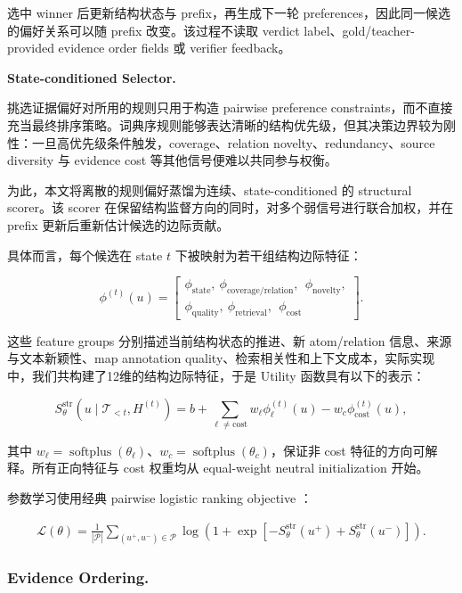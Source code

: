 \documentclass[letterpaper]{article}
\begin{document}
选中 winner 后更新结构状态与 prefix，再生成下一轮 preferences，因此同一候选的偏好关系可以随 prefix 改变。该过程不读取 verdict label、gold/teacher-provided evidence order fields 或 verifier feedback。

\textbf{State-conditioned Selector.}

挑选证据偏好对所用的规则只用于构造 pairwise preference constraints，而不直接充当最终排序策略。词典序规则能够表达清晰的结构优先级，但其决策边界较为刚性：一旦高优先级条件触发，coverage、relation novelty、redundancy、source diversity 与 evidence cost 等其他信号便难以共同参与权衡。

为此，本文将离散的规则偏好蒸馏为连续、state-conditioned 的 structural scorer。该 scorer 在保留结构监督方向的同时，对多个弱信号进行联合加权，并在 prefix 更新后重新估计候选的边际贡献。

具体而言，每个候选在 state $t$ 下被映射为若干组结构边际特征：

\[
\phi^{(t)}(u)=\left[
\begin{gathered}
\phi_{\mathrm{state}},\ \phi_{\mathrm{coverage/relation}},\
\ \phi_{\mathrm{novelty}},\\
\phi_{\mathrm{quality}},\ \phi_{\mathrm{retrieval}},\
\ \phi_{\mathrm{cost}}
\end{gathered}
\right].
\]

这些 feature groups 分别描述当前结构状态的推进、新 atom/relation 信息、来源与文本新颖性、map annotation quality、检索相关性和上下文成本，实际实现中，我们共构建了12维的结构边际特征，于是 Utility 函数具有以下的表示：

\[
S_\theta^{\mathrm{str}}(u\mid\mathcal T_{<t},H^{(t)})
=b+\sum_{\ell\ne\mathrm{cost}}w_\ell\phi_\ell^{(t)}(u)
-w_c\phi_{\mathrm{cost}}^{(t)}(u),
\]

其中 $w_\ell=\operatorname{softplus}(\theta_\ell)$、$w_c=\operatorname{softplus}(\theta_c)$，保证非 cost 特征的方向可解释。所有正向特征与 cost 权重均从 equal-weight neutral initialization 开始。

参数学习使用经典 pairwise logistic ranking objective \citep{Burges2005RankNet}：

\[
\begin{aligned}
\mathcal L(\theta)
={}\frac{1}{|\mathcal P|}
\sum_{(u^+,u^-)\in\mathcal P}\log\!\left(1+\exp\!\left[
-S_\theta^{\mathrm{str}}(u^+)+S_\theta^{\mathrm{str}}(u^-)
\right]\right).
\end{aligned}
\]

\subsubsection{Evidence Ordering.}
\end{document}
